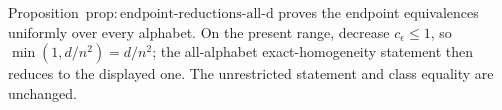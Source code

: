 Proposition~\(\mathrm{prop:endpoint\text{-}reductions\text{-}all\text{-}d}\) proves the endpoint equivalences uniformly over every alphabet.  On the present range, decrease \(c_{\epsilon}\le1\), so \(\min(1,d/n^2)=d/n^2\); the all-alphabet exact-homogeneity statement then reduces to the displayed one.  The unrestricted statement and class equality are unchanged.